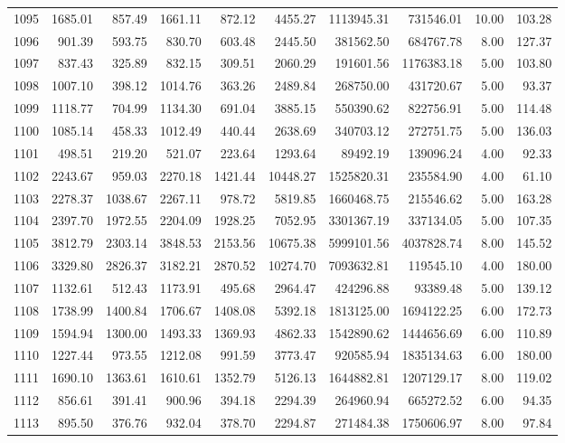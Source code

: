 \begin{tabular}{lrrrrrrrrr}
1095 & 1685.01 & 857.49 & 1661.11 & 872.12 & 4455.27 & 1113945.31 & 731546.01 & 10.00 & 103.28 \\
1096 & 901.39 & 593.75 & 830.70 & 603.48 & 2445.50 & 381562.50 & 684767.78 & 8.00 & 127.37 \\
1097 & 837.43 & 325.89 & 832.15 & 309.51 & 2060.29 & 191601.56 & 1176383.18 & 5.00 & 103.80 \\
1098 & 1007.10 & 398.12 & 1014.76 & 363.26 & 2489.84 & 268750.00 & 431720.67 & 5.00 & 93.37 \\
1099 & 1118.77 & 704.99 & 1134.30 & 691.04 & 3885.15 & 550390.62 & 822756.91 & 5.00 & 114.48 \\
1100 & 1085.14 & 458.33 & 1012.49 & 440.44 & 2638.69 & 340703.12 & 272751.75 & 5.00 & 136.03 \\
1101 & 498.51 & 219.20 & 521.07 & 223.64 & 1293.64 & 89492.19 & 139096.24 & 4.00 & 92.33 \\
1102 & 2243.67 & 959.03 & 2270.18 & 1421.44 & 10448.27 & 1525820.31 & 235584.90 & 4.00 & 61.10 \\
1103 & 2278.37 & 1038.67 & 2267.11 & 978.72 & 5819.85 & 1660468.75 & 215546.62 & 5.00 & 163.28 \\
1104 & 2397.70 & 1972.55 & 2204.09 & 1928.25 & 7052.95 & 3301367.19 & 337134.05 & 5.00 & 107.35 \\
1105 & 3812.79 & 2303.14 & 3848.53 & 2153.56 & 10675.38 & 5999101.56 & 4037828.74 & 8.00 & 145.52 \\
1106 & 3329.80 & 2826.37 & 3182.21 & 2870.52 & 10274.70 & 7093632.81 & 119545.10 & 4.00 & 180.00 \\
1107 & 1132.61 & 512.43 & 1173.91 & 495.68 & 2964.47 & 424296.88 & 93389.48 & 5.00 & 139.12 \\
1108 & 1738.99 & 1400.84 & 1706.67 & 1408.08 & 5392.18 & 1813125.00 & 1694122.25 & 6.00 & 172.73 \\
1109 & 1594.94 & 1300.00 & 1493.33 & 1369.93 & 4862.33 & 1542890.62 & 1444656.69 & 6.00 & 110.89 \\
1110 & 1227.44 & 973.55 & 1212.08 & 991.59 & 3773.47 & 920585.94 & 1835134.63 & 6.00 & 180.00 \\
1111 & 1690.10 & 1363.61 & 1610.61 & 1352.79 & 5126.13 & 1644882.81 & 1207129.17 & 8.00 & 119.02 \\
1112 & 856.61 & 391.41 & 900.96 & 394.18 & 2294.39 & 264960.94 & 665272.52 & 6.00 & 94.35 \\
1113 & 895.50 & 376.76 & 932.04 & 378.70 & 2294.87 & 271484.38 & 1750606.97 & 8.00 & 97.84 \\

\end{tabular}
